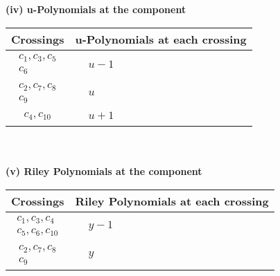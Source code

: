 \documentclass[1p]{elsarticle_modified}
\theoremstyle{definition}
\begin{document}
\newpage\renewcommand{\arraystretch}{1}
\flushleft \textbf{(iv) u-Polynomials at the component}\newline \\
\begin{tabular}{m{50pt}|m{274pt}}
Crossings & \hspace{64pt}u-Polynomials at each crossing \\
\hline $$\begin{aligned}c_{1},c_{3},c_{5}\\c_{6}\end{aligned}$$&$\begin{aligned}
&u-1
\end{aligned}$\\
\hline $$\begin{aligned}c_{2},c_{7},c_{8}\\c_{9}\end{aligned}$$&$\begin{aligned}
&u
\end{aligned}$\\
\hline $$\begin{aligned}c_{4},c_{10}\end{aligned}$$&$\begin{aligned}
&u+1
\end{aligned}$\\
\hline
\end{tabular}\\~\\
\newpage\renewcommand{\arraystretch}{1}
\flushleft \textbf{(v) Riley Polynomials at the component}\newline \\
\begin{tabular}{m{50pt}|m{274pt}}
Crossings & \hspace{64pt}Riley Polynomials at each crossing \\
\hline $$\begin{aligned}c_{1},c_{3},c_{4}\\c_{5},c_{6},c_{10}\end{aligned}$$&$\begin{aligned}
&y-1
\end{aligned}$\\
\hline $$\begin{aligned}c_{2},c_{7},c_{8}\\c_{9}\end{aligned}$$&$\begin{aligned}
&y
\end{aligned}$\\
\hline
\end{tabular}\\~\\
\end{document}
